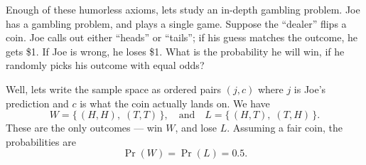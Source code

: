 \M
Enough of these humorless axioms, lets study an in-depth gambling
problem. Joe has a gambling problem, and plays a single game. Suppose
the ``dealer'' flips a coin. Joe calls out either ``heads'' or
``tails''; if his guess matches the outcome, he gets \$1. If Joe is
wrong, he loses \$1. What is the probability he will win, if he randomly
picks his outcome with equal odds?

Well, lets write the sample space as ordered pairs $(j,c)$ where $j$ is
Joe's prediction and $c$ is what the coin actually lands on. We have
\begin{equation}
W=\{\,(H,H),\;(T,T)\,\},\quad\mbox{and}\quad
L=\{\,(H,T),\;(T,H)\,\}.
\end{equation}
These are the only outcomes --- win $W$, and lose $L$. Assuming a fair
coin, the probabilities are
\begin{equation}
\Pr(W)=\Pr(L)=0.5.
\end{equation}



